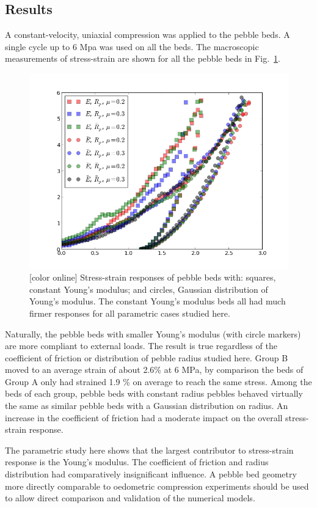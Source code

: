 \subsection{Results}


A constant-velocity, uniaxial compression was applied to the pebble beds. A single cycle up to 6 Mpa was used on all the beds. The macroscopic measurements of stress-strain are shown for all the pebble beds in Fig.~\ref{fig:stress-strain}.

\begin{figure}[t]
  \centering
  \includegraphics[width = 0.75 \textwidth]{chapters/figures/stress-strain}
  \caption{[color online] Stress-strain responses of pebble beds with: squares, constant Young's modulus; and circles, Gaussian distribution of Young's modulus. The constant Young's modulus beds all had much firmer responses for all parametric cases studied here.}\label{fig:stress-strain}
\end{figure}

Naturally, the pebble beds with smaller Young’s modulus (with circle markers) are more compliant to external loads. The result is true regardless of the coefficient of friction or distribution of pebble radius studied here. Group B moved to an average strain of about 2.6\% at 6 MPa, by comparison the beds of Group A only had strained 1.9 \% on average to reach the same stress. Among the beds of each group, pebble beds with constant radius pebbles behaved virtually the same as similar pebble beds with a Gaussian distribution on radius. An increase in the coefficient of friction had a moderate impact on the overall stress-strain response. 


The parametric study here shows that the largest contributor to stress-strain response is the Young’s modulus. The coefficient of friction and radius distribution had comparatively insignificant influence. A pebble bed geometry more directly comparable to oedometric compression experiments should be used to allow direct comparison and validation of the numerical models.


